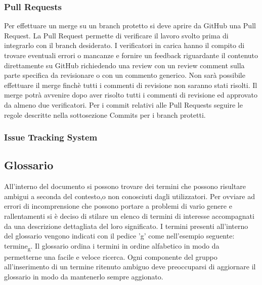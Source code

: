 \subsubsection{Pull Requests}
Per effettuare un merge su un branch protetto si deve aprire da GitHub una Pull Request.
La Pull Request permette di verificare il lavoro svolto prima di integrarlo con il branch desiderato.
I verificatori in carica hanno il compito di trovare eventuali errori o mancanze e fornire un feedback riguardante il contenuto direttamente su GitHub richiedendo
una review con un review comment sulla parte specifica da revisionare o con un commento generico.
Non sarà possibile effettuare il merge finchè tutti i commenti di revisione non saranno stati risolti.
Il merge potrà avvenire dopo aver risolto tutti i commenti di revisione ed approvato da almeno due verificatori.
Per i commit relativi alle Pull Requests seguire le regole descritte nella sottosezione Commits per i branch protetti.



\subsubsection{Issue Tracking System}



\subsection{Glossario}
All'interno del documento si possono trovare dei termini che possono risultare ambigui a seconda del contesto,o non conosciuti dagli utilizzatori.
Per ovviare ad errori di incomprensione che possono portare a problemi di vario genere e rallentamenti si è deciso di stilare un elenco di termini 
di interesse accompagnati da una descrizione dettagliata del loro significato.
I termini presenti all'interno del glossario vengono indicati con il pedice 'g' come nell'esempio seguente: termine\textsubscript{g}.
Il glossario ordina i termini in ordine alfabetico in modo da permetterne una facile e veloce ricerca.
Ogni componente del gruppo all'inserimento di un termine ritenuto ambiguo deve preoccuparsi di aggiornare il glossario in modo da mantenerlo sempre aggionato.
